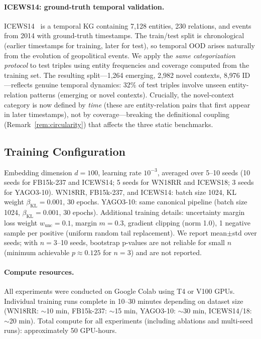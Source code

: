\documentclass{article}
\begin{document}
\paragraph{ICEWS14: ground-truth temporal validation.}
ICEWS14~\citep{garcia2018learning} is a temporal KG containing 7,128 entities, 230 relations, and events from 2014 with ground-truth timestamps. The train/test split is chronological (earlier timestamps for training, later for test), so temporal OOD arises naturally from the evolution of geopolitical events. We apply the \emph{same categorization protocol} to test triples using entity frequencies and coverage computed from the training set. The resulting split---1,264 emerging, 2,982 novel contexts, 8,976 ID---reflects genuine temporal dynamics: 32\% of test triples involve unseen entity-relation patterns (emerging or novel contexts). Crucially, the novel-context category is now defined by \emph{time} (these are entity-relation pairs that first appear in later timestamps), not by coverage---breaking the definitional coupling (Remark~\ref{rem:circularity}) that affects the three static benchmarks.

\subsection{Training Configuration}
\label{app:training_config}

Embedding dimension $d=100$, learning rate $10^{-3}$, averaged over 5--10 seeds (10 seeds for FB15k-237 and ICEWS14; 5 seeds for WN18RR and ICEWS18; 3 seeds for YAGO3-10).
WN18RR, FB15k-237, and ICEWS14: batch size 1024, KL weight $\beta_{\text{KL}}=0.001$, 30 epochs.
YAGO3-10: same canonical pipeline (batch size 1024, $\beta_{\text{KL}}=0.001$, 30 epochs).
Additional training details: uncertainty margin loss weight $w_{\text{unc}}=0.1$, margin $m=0.3$, gradient clipping (norm 1.0), 1 negative sample per positive (uniform random tail replacement).
We report mean$\pm$std over seeds; with $n{=}3$--10 seeds, bootstrap p-values are not reliable for small $n$ (minimum achievable $p{\approx}0.125$ for $n{=}3$) and are not reported.

\paragraph{Compute resources.}
All experiments were conducted on Google Colab using T4 or V100 GPUs. Individual training runs complete in 10--30 minutes depending on dataset size (WN18RR: $\sim$10 min, FB15k-237: $\sim$15 min, YAGO3-10: $\sim$30 min, ICEWS14/18: $\sim$20 min). Total compute for all experiments (including ablations and multi-seed runs): approximately 50 GPU-hours.
\end{document}
